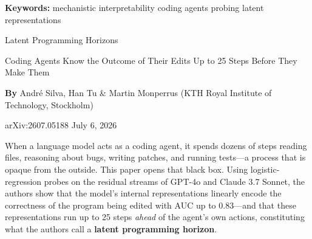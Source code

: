 \documentclass[10pt,twocolumn]{article}
\begin{document}
\setlength{\parindent}{0pt}
\setlength{\parskip}{4pt}

{\small\color{keywordgray}\textbf{Keywords:}
  mechanistic interpretability \textbullet{}
  coding agents \textbullet{}
  probing \textbullet{}
  latent representations}\par\vspace{4pt}

{\LARGE\bfseries\raggedright
  Latent Programming Horizons}\par\vspace{4pt}

{\large\itshape\raggedright
  Coding Agents Know the Outcome of Their Edits
  Up to 25 Steps Before They Make Them}\par\vspace{6pt}

{\small\textbf{By} Andr\'e Silva, Han Tu \& Martin Monperrus
  (KTH Royal Institute of Technology, Stockholm)}\par\vspace{2pt}

{\small\color{keywordgray}arXiv:2607.05188 \textbullet{}
  July 6, 2026}
\par\vspace{2pt}\noindent{\color{rulered}\rule{\columnwidth}{0.6pt}}\vspace{6pt}

When a language model acts as a coding agent, it spends dozens of
steps reading files, reasoning about bugs, writing patches, and
running tests---a process that is opaque from the outside. This paper
opens that black box. Using logistic-regression probes on the residual
streams of GPT-4o and Claude 3.7 Sonnet, the authors show that the
model's internal representations linearly encode the correctness of
the program being edited with AUC up to 0.83---and that these
representations run up to 25 steps \emph{ahead} of the agent's
own actions, constituting what the authors call a \textbf{latent
programming horizon}.
\end{document}
